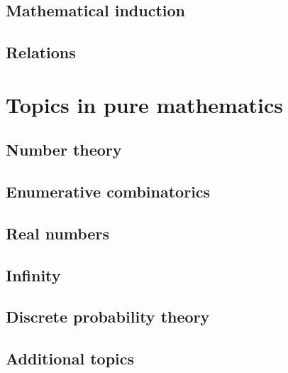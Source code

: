 \documentclass[10pt]{book}
\begin{document}
\chapter{Mathematical induction}
    \label{chMathematicalInduction}
    

\chapter{Relations}
    \label{chRelations}
    

\part{Topics in pure mathematics}
\label{ptTopics}

\chapter{Number theory}
    \label{chNumberTheory}
    

\chapter{Enumerative combinatorics}
    \label{chCombinatorics}
    
    
\chapter{Real numbers}
    \label{chRealNumbers}
    
    
\chapter{Infinity}
    \label{chInfinity}
    
    
\chapter{Discrete probability theory}
    \label{chProbabilityTheory}
    
    
\chapter{Additional topics}
    \label{chAdditionalTopics}
    
\end{document}
